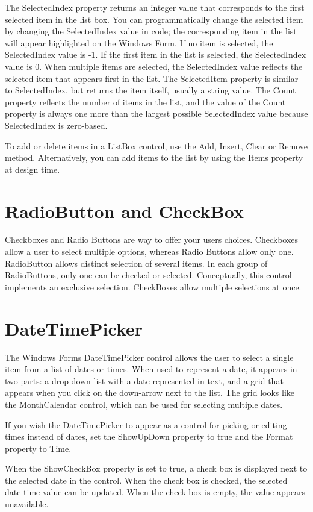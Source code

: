 The SelectedIndex property returns an integer value that corresponds to the first selected item in the
list box. You can programmatically change the selected item by changing the SelectedIndex value in
code; the corresponding item in the list will appear highlighted on the Windows Form. If no item is
selected, the SelectedIndex value is -1. If the first item in the list is selected, the SelectedIndex
value is 0. When multiple items are selected, the SelectedIndex value reflects the selected item that
appears first in the list. The SelectedItem property is similar to SelectedIndex, but returns the item
itself, usually a string value. The Count property reflects the number of items in the list, and the
value of the Count property is always one more than the largest possible SelectedIndex value
because SelectedIndex is zero-based.

To add or delete items in a ListBox control, use the Add, Insert, Clear or Remove method.
Alternatively, you can add items to the list by using the Items property at design time.

\section{RadioButton and CheckBox}
Checkboxes and Radio Buttons are way to offer your users choices. Checkboxes allow a user to
select multiple options, whereas Radio Buttons allow only one. RadioButton allows distinct
selection of several items. In each group of RadioButtons, only one can be checked or selected.
Conceptually, this control implements an exclusive selection. CheckBoxes allow multiple selections
at once.


\section{DateTimePicker}
The Windows Forms DateTimePicker control allows the user to select a single item from a list of
dates or times. When used to represent a date, it appears in two parts: a drop-down list with a date
represented in text, and a grid that appears when you click on the down-arrow next to the list. The
grid looks like the MonthCalendar control, which can be used for selecting multiple dates.

If you wish the DateTimePicker to appear as a control for picking or editing times instead of dates,
set the ShowUpDown property to true and the Format property to Time.

When the ShowCheckBox property is set to true, a check box is displayed next to the selected
date in the control. When the check box is checked, the selected date-time value can be updated.
When the check box is empty, the value appears unavailable.

